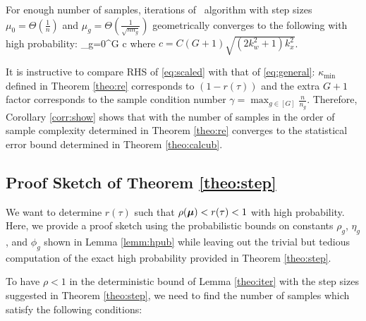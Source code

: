 \begin{corollary}
	\label{corr:show}
	For enough number of samples, iterations of \dc\ algorithm with step sizes $\mu_0 = \Theta(\frac{1}{n})$ and $\mu_g =  \Theta(\frac{1}{\sqrt{n n_g}})$ geometrically converges to the following with high probability:
	{\small\beq
	\label{eq:scaled}
	\sum_{g=0}^{G}  
	\leq c 
	\eeq}
	where $c = C(G+1)\sqrt{(2k_w^2 + 1)k_x^2}$. 
\end{corollary}
	It is instructive to compare RHS of \eqref{eq:scaled} with that of \eqref{eq:general}: $\kappa_{\min}$ defined in Theorem \ref{theo:re} corresponds to $(1 - r(\tau))$ %
	and the extra $G+1$ factor corresponds to the sample condition number $\gamma = \max_{g \in [G] } \frac{n}{n_g}$.
	Therefore, Corollary \ref{corr:show} shows that with the number of samples in the order of sample complexity determined in Theorem \ref{theo:re} \dc{} converges to the statistical error bound determined in Theorem \ref{theo:calcub}.
	
\subsection{Proof Sketch of Theorem \ref{theo:step}}
\label{proofsketch}
	We want to determine $r(\tau)$ such that $\rho(\boldsymbol{\mu}) < r(\tau) < 1$ with high probability. Here, we provide a proof sketch using the probabilistic bounds on constants $\rho_g$, $\eta_g$, and $\phi_g$ shown in Lemma \ref{lemm:hpub} while leaving out the trivial but tedious computation of the exact high probability provided in Theorem \ref{theo:step}. 
	
		
	To have $\rho < 1$ in the deterministic bound of Lemma \ref{theo:iter} with the step sizes suggested in Theorem \ref{theo:step}, we need to find the number of samples which satisfy the following conditions:
	

